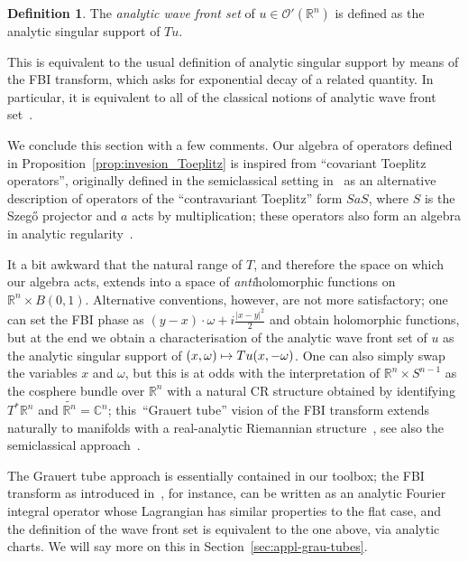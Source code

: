 \documentclass[10pt]{amsart}
\theoremstyle{definition}\newtheorem{defi}[theo]{Definition}\newtheorem{rema}[theo]{Remark}\newtheorem{exam}[theo]{Example}\newtheorem{exem}[theo]{Example}\newtheorem{nota}[theo]{Notation}
\newcommand{\clO}{\mathcal{O}}
\newcommand\1{\mathds{1}}
\newcommand{\R}{\mathbb{R}}
\newcommand{\C}{\mathbb{C}}
\let\oldmapsto\mapsto
\renewcommand*{\mapsto}{\mathchoice{\longmapsto}{\oldmapsto}{\oldmapsto}{\oldmapsto}}
\begin{document}
\begin{defi}\label{def:WFa}
The \emph{analytic wave front set} of $u\in \clO'(\R^n)$ is defined as the analytic singular support of $Tu$.
\end{defi}

This is equivalent to the usual definition of analytic singular support by means of the FBI transform, which asks for exponential decay of a related quantity. In particular, it is equivalent to all of the classical notions of analytic wave front set~\cite{bony_equivalence_1977}.

We conclude this section with a few comments. Our algebra of operators defined in Proposition~\ref{prop:invesion_Toeplitz} is inspired from ``covariant Toeplitz operators'', originally defined in the semiclassical setting in~\cite{charles_berezin-toeplitz_2003} as an alternative description of operators of the ``contravariant Toeplitz'' form $SaS$, where $S$ is the Szeg\H{o} projector and $a$ acts by multiplication; these operators also form an algebra in analytic regularity~\cite{deleporte_toeplitz_2018,rouby_analytic_2018}.

It a bit awkward that the natural range of $T$, and therefore the space on which our algebra acts, extends into a space of \emph{anti}holomorphic functions on $\R^n\times B(0,1)$. Alternative conventions, however, are not more satisfactory; one can set the FBI phase as $(y-x)\cdot
\omega+i\frac{|x-y|^2}{2}$ and obtain holomorphic functions, but at the end we obtain a characterisation of the analytic wave front set of $u$ as the analytic singular support of $(x,\omega)\mapsto Tu(x,-\omega)$. One can also simply swap the variables $x$ and $\omega$, but this is at odds with the interpretation of $\R^n\times S^{n-1}$ as the cosphere bundle over $\R^n$ with a natural CR structure obtained by identifying $T^*\R^n$ and $\widetilde{\R^n}=\C^n$; this~``Grauert tube'' vision of the FBI transform extends naturally to manifolds with a real-analytic Riemannian structure~\cite{guillemin_grauert_1991,guillemin_grauert_1992,leichtnam_intrinsic_1996}, see also the semiclassical approach~\cite{sjostrand_density_1996}.

The Grauert tube approach is essentially contained in our toolbox; the FBI transform as introduced in~\cite{leichtnam_intrinsic_1996}, for instance, can be written as an analytic Fourier integral operator whose Lagrangian has similar properties to the flat case, and the definition of the wave front set is equivalent to the one above, via analytic charts. We will say more on this in Section~\ref{sec:appl-grau-tubes}.
\end{document}
